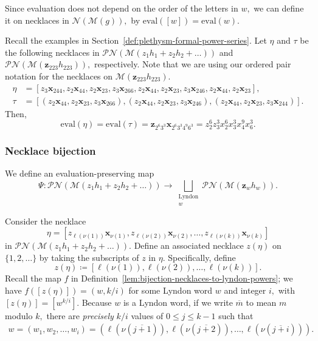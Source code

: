 \documentclass[ALCO, Unicode]{cedram}
\begin{document}
 Since evaluation does not depend on the order of the letters in $w,$ we can define it on necklaces in $\mathscr{N}(\mathcal{M}(g)),$ by $\mathrm{eval}([w]) = \mathrm{eval}(w).$ \begin{exam} \label{ex:eval-example}
     Recall the examples in Section~\ref{def:plethysm-formal-power-series}. Let $\eta$ and $\tau$ be the following necklaces in $\mathscr{PN}\left(\mathcal{M}\left( z_1h_1 + z_2h_2 + \ldots \right)\right)$ and $\mathscr{PN}\left(\mathcal{M}\left(\mathbf{z}_{223}h_{223}\right)\right),$ respectively. Note that we are using our ordered pair notation for the necklaces on $\mathcal{M}(\mathbf{z}_{223}h_{223}).$ 
     \begin{align*}  \eta &= \left[z_3\mathbf{x}_{244}, z_2\mathbf{x}_{44}, z_2\mathbf{x}_{23}, z_3\mathbf{x}_{266}, z_2\mathbf{x}_{44}, z_2\mathbf{x}_{23}, z_3\mathbf{x}_{246}, z_2\mathbf{x}_{44},  z_2\mathbf{x}_{23} \right],\\
    \tau &= \left[\left(z_2\mathbf{x}_{44}, z_2\mathbf{x}_{23}, z_3\mathbf{x}_{266}\right), \left(z_2\mathbf{x}_{44}, z_2\mathbf{x}_{23}, z_3\mathbf{x}_{246}\right), \left(z_2\mathbf{x}_{44},  z_2\mathbf{x}_{23}, z_3\mathbf{x}_{244}\right)\right].
\end{align*}
Then, \[\mathrm{eval}(\eta) = \mathrm{eval}(\tau) = \mathbf{z}_{2^6 3^3}\mathbf{x}_{2^6 3^3 4^9 6^3} = z_2^6z_3^3 x_2^6x_3^3 x_4^9x_6^3.\]
 \end{exam}
    
\subsubsection{Necklace bijection
}\label{sec:necklace-bij}
We define an evaluation-preserving map \[\Psi: \mathscr{PN}\left(\mathcal{M}\left(z_1 h_1 + z_2h_2 + \ldots\right)\right) \longrightarrow \bigsqcup_{\substack{\text{Lyndon}\\ w}}\mathscr{PN}\left(\mathcal{M}\left(\mathbf{z}_wh_w\right)\right).\] 

Consider the necklace\[\eta = \left[z_{\ell\left(\nu(1)\right)}\mathbf{x}_{\nu(1)}, z_{\ell\left(\nu(2)\right)}\mathbf{x}_{\nu(2)}, \ldots, z_{\ell \left(\nu(k)\right)}\mathbf{x}_{\nu(k)}\right]\] in $\mathscr{PN}\left(\mathcal{M}\left(z_1h_1 + z_2 h_2 + \ldots \right)\right).$ Define an associated necklace $z(\eta)$ on $\{1, 2, \ldots\}$ by taking the subscripts of $z$ in $\eta.$ Specifically, define \[z(\eta)  \coloneqq  \left[\ell \left(\nu(1)\right), \ell\left(\nu(2)\right), \ldots, \ell\left(\nu(k)\right)\right].\] 
Recall the map $f$ in Definition~\ref{lem:bijection-necklaces-to-lyndon-powers}; we have $f([z(\eta)]) = \left(w, k / i\right)$ for some Lyndon word $w$ and integer $i,$ with $[z(\eta)] = [w^{k / i}].$ Because $w$ is a Lyndon word, if we write $\overline{m}$ to mean $m$ modulo $k,$ there are \textit{precisely} $k/i$ values of $0 \leq j \leq k - 1$ such that
\begin{align}\label{eqn:z(eta)}
    w = (w_1,w_2, \ldots, w_i) =  \left(\ell \left(\nu(\overline{j + 1})\right), \ell\left(\nu(\overline{j + 2})\right), \ldots, \ell\left(\nu(\overline{j + i})\right)\right).
\end{align}
\end{document}

